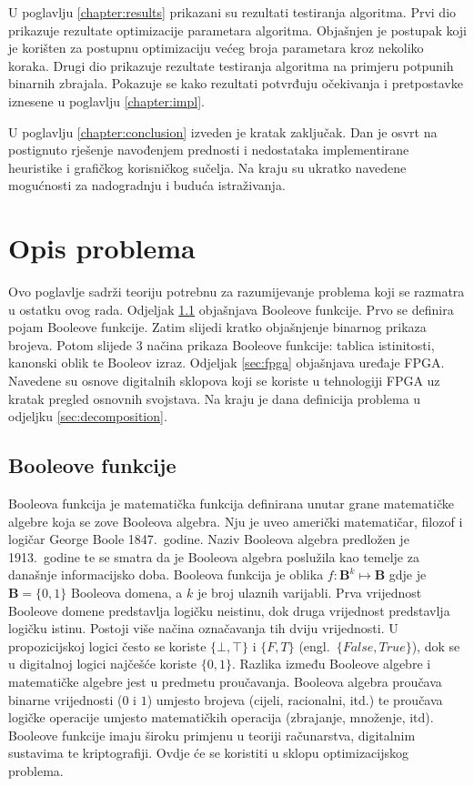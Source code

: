 \documentclass[times, utf8, diplomski]{fer}
\begin{document}
U poglavlju \ref{chapter:results} prikazani su rezultati testiranja algoritma. Prvi dio prikazuje rezultate optimizacije parametara algoritma. Objašnjen je postupak koji je korišten za postupnu optimizaciju većeg broja parametara kroz nekoliko koraka. Drugi dio prikazuje rezultate testiranja algoritma na primjeru potpunih binarnih zbrajala. Pokazuje se kako rezultati potvrđuju očekivanja i pretpostavke iznesene u poglavlju \ref{chapter:impl}.

U poglavlju \ref{chapter:conclusion} izveden je kratak zaključak. Dan je osvrt na postignuto rješenje navođenjem prednosti i nedostataka implementirane heuristike i grafičkog korisničkog sučelja. Na kraju su ukratko navedene mogućnosti za nadogradnju i buduća istraživanja.

\chapter{Opis problema} \label{chapter:problem}

Ovo poglavlje sadrži teoriju potrebnu za razumijevanje problema koji se razmatra u ostatku ovog rada. Odjeljak \ref{sec:bool-func} objašnjava Booleove funkcije. Prvo se definira pojam Booleove funkcije. Zatim slijedi kratko objašnjenje binarnog prikaza brojeva. Potom slijede $3$ načina prikaza Booleove funkcije: tablica istinitosti, kanonski oblik te Booleov izraz. Odjeljak \ref{sec:fpga} objašnjava uređaje FPGA. Navedene su osnove digitalnih sklopova koji se koriste u tehnologiji FPGA uz kratak pregled osnovnih svojstava. Na kraju je dana definicija problema u odjeljku \ref{sec:decomposition}.


\section{Booleove funkcije} \label{sec:bool-func}

Booleova funkcija je matematička funkcija definirana unutar grane matematičke algebre koja se zove Booleova algebra. Nju je uveo američki matematičar, filozof i logičar George Boole 1847.~godine. Naziv Booleova algebra predložen je 1913.~godine te se smatra da je Booleova algebra poslužila kao temelje za današnje informacijsko doba. Booleova funkcija je oblika $f:\boldsymbol{B}^{k}\mapsto \boldsymbol{B}$ gdje je $\boldsymbol{B}=\{0, 1\}$ Booleova domena, a $k$ je broj ulaznih varijabli. Prva vrijednost Booleove domene predstavlja logičku neistinu, dok druga vrijednost predstavlja logičku istinu. Postoji više načina označavanja tih dviju vrijednosti. U propozicijskoj logici često se koriste $\{\bot, \top \}$ i $\{F, T\}$ (engl.~\textit{$\{False, True\}$}), dok se u digitalnoj logici najčešće koriste $\{0, 1\}$. Razlika između Booleove algebre i matematičke algebre jest u predmetu proučavanja. Booleova algebra proučava binarne vrijednosti ($0$ i $1$) umjesto brojeva (cijeli, racionalni, itd.) te proučava logičke operacije umjesto matematičkih operacija (zbrajanje, množenje, itd). Booleove funkcije imaju široku primjenu u teoriji računarstva, digitalnim sustavima te kriptografiji. Ovdje će se koristiti u sklopu optimizacijskog problema.
\end{document}
